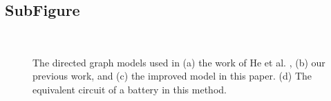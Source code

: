 \documentclass[a4paper]{article}
\begin{document}
\subsection{SubFigure}

\begin{figure}[htbp]
    \centering
    \label{fig:direct-graph-he}
    \label{fig:direct-graph-xu}
    \label{fig:direct-graph-my}
    \\
    \label{fig:battery-simple}
    \caption{
        The directed graph models used in (a) the work of He et al. \cite{heExploringAdaptiveReconfiguration2013}, (b) our previous work, and (c) the improved model in this paper.
        (d) The equivalent circuit of a battery in this method.
    }
    \label{fig:model}
\end{figure}
\end{document}
